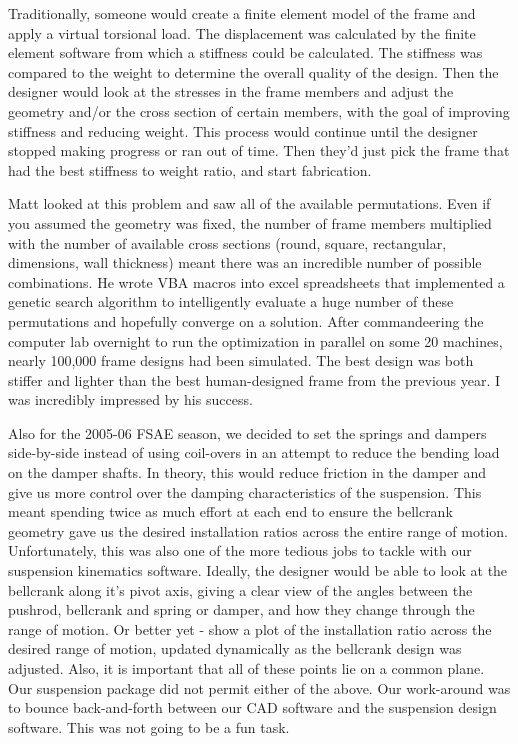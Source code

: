 Traditionally, someone would create a finite element model of the frame and apply a virtual torsional load.  The displacement was calculated by the finite element software from which a stiffness could be calculated.  The stiffness was compared to the weight to determine the overall quality of the design.  Then the designer would look at the stresses in the frame members and adjust the geometry and/or the cross section of certain members, with the goal of improving stiffness and reducing weight.  This process would continue until the designer stopped making progress or ran out of time.  Then they'd just pick the frame that had the best stiffness to weight ratio, and start fabrication.

Matt looked at this problem and saw all of the available permutations.  Even if you assumed the geometry was fixed, the number of frame members multiplied with the number of available cross sections (round, square, rectangular, dimensions, wall thickness) meant there was an incredible number of possible combinations.  He wrote VBA macros into excel spreadsheets that implemented a genetic search algorithm to intelligently evaluate a huge number of these permutations and hopefully converge on a solution.  After commandeering the computer lab overnight to run the optimization in parallel on some 20 machines, nearly 100,000 frame designs had been simulated.  The best design was both stiffer and lighter than the best human-designed frame from the previous year.  I was incredibly impressed by his success.

Also for the 2005-06 FSAE season, we decided to set the springs and dampers side-by-side instead of using coil-overs in an attempt to reduce the bending load on the damper shafts.  In theory, this would reduce friction in the damper and give us more control over the damping characteristics of the suspension.  This meant spending twice as much effort at each end to ensure the bellcrank geometry gave us the desired installation ratios across the entire range of motion.  Unfortunately, this was also one of the more tedious jobs to tackle with our suspension kinematics software.  Ideally, the designer would be able to look at the bellcrank along it's pivot axis, giving a clear view of the angles between the pushrod, bellcrank and spring or damper, and how they change through the range of motion.  Or better yet - show a plot of the installation ratio across the desired range of motion, updated dynamically as the bellcrank design was adjusted.  Also, it is important that all of these points lie on a common plane.  Our suspension package did not permit either of the above.  Our work-around was to bounce back-and-forth between our CAD software and the suspension design software.  This was not going to be a fun task.

